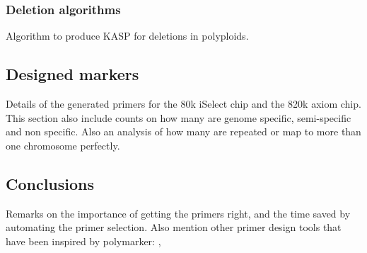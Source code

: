 \subsubsection{Deletion algorithms}
Algorithm to produce KASP for deletions in polyploids. 

\subsection{Designed markers} Details of the generated primers for the 80k iSelect chip and the 820k axiom chip. This section also include counts on how many are genome specific, semi-specific and non specific. Also an analysis of how many are repeated or map to more than one chromosome perfectly.

\subsection{Conclusions} Remarks on the importance of getting the primers right, and the time saved by automating the primer selection. Also mention other primer design tools that have been inspired by polymarker: \cite{Ma2015}, \cite{Wang2016}

